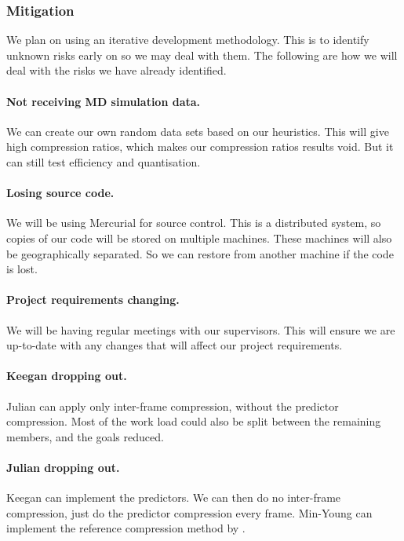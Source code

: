 \documentclass[a4paper,twocolumn]{article}
\begin{document}
\subsubsection*{Mitigation}

We plan on using an iterative development methodology. This is to identify
unknown risks early on so we may deal with them. The following are how we will
deal with the risks we have already identified.

\paragraph{Not receiving MD simulation data.} We can create our own random
data sets based on our heuristics. This will give high compression ratios,
which makes our compression ratios results void. But it can still test
efficiency and quantisation.

\paragraph{Losing source code.} We will be using Mercurial for source
control. This is a distributed system, so copies of our code will be stored on
multiple machines. These machines will also be geographically separated. So we
can restore from another machine if the code is lost.

\paragraph{Project requirements changing.} We will be having regular meetings
with our supervisors. This will ensure we are up-to-date with any changes that will affect our project requirements.

\paragraph{Keegan dropping out.} Julian can apply only inter-frame
compression, without the predictor compression. Most of the work load could
also be split between the remaining members, and the goals reduced.

\paragraph{Julian dropping out.} Keegan can implement the predictors. We can
then do no inter-frame compression, just do the predictor compression every
frame. Min-Young can implement the reference compression method by
\citep{omeltchenko2000sls}.
\end{document}

